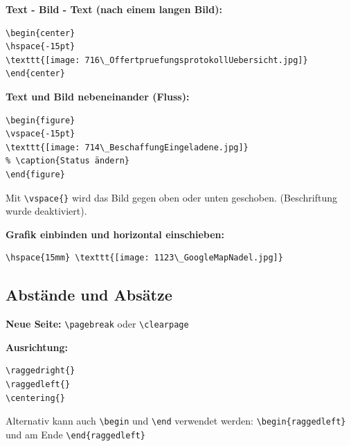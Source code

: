 \vspace{\baselineskip}

\textbf{Text - Bild - Text (nach einem langen Bild):}

\begin{verbatim}
\begin{center}
\hspace{-15pt}   
\texttt{[image: 716\_OffertpruefungsprotokollUebersicht.jpg]}
\end{center}
\end{verbatim}

\textbf{Text und Bild nebeneinander (Fluss):}

\begin{verbatim}
\begin{figure}
\vspace{-15pt}
\texttt{[image: 714\_BeschaffungEingeladene.jpg]}
% \caption{Status ändern}
\end{figure}
\end{verbatim}

Mit \verb+\vspace{}+ wird das Bild gegen oben oder unten geschoben. (Beschriftung wurde deaktiviert).

\vspace{\baselineskip}

\textbf{Grafik einbinden und horizontal einschieben:}

\begin{verbatim}
\hspace{15mm} \texttt{[image: 1123\_GoogleMapNadel.jpg]}
\end{verbatim}




\subsection{Abstände und Absätze}

\textbf{Neue Seite:}
\verb+\pagebreak+ oder \verb+\clearpage+

\vspace{\baselineskip}

\textbf{Ausrichtung:}

\begin{verbatim}
\raggedright{}
\raggedleft{}
\centering{}
\end{verbatim}

Alternativ kann auch \verb+\begin+ und \verb+\end+ verwendet werden:
\verb+\begin{raggedleft}+ und am Ende \verb+\end{raggedleft}+

